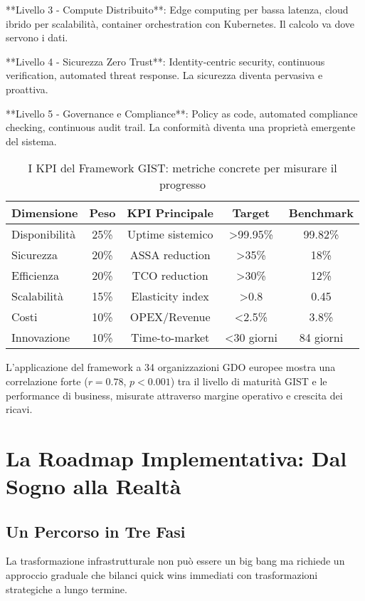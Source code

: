 \documentclass[12pt,a4paper,twoside]{book}
\begin{document}
**Livello 3 - Compute Distribuito**: Edge computing per bassa latenza, cloud ibrido per scalabilità, container orchestration con Kubernetes. Il calcolo va dove servono i dati.

**Livello 4 - Sicurezza Zero Trust**: Identity-centric security, continuous verification, automated threat response. La sicurezza diventa pervasiva e proattiva.

**Livello 5 - Governance e Compliance**: Policy as code, automated compliance checking, continuous audit trail. La conformità diventa una proprietà emergente del sistema.

\begin{table}[htbp]
\centering
\caption{I KPI del Framework GIST: metriche concrete per misurare il progresso}
\label{tab:gist_kpi}
\begin{tabular}{lcccc}
\toprule
\textbf{Dimensione} & \textbf{Peso} & \textbf{KPI Principale} & \textbf{Target} & \textbf{Benchmark} \\
\midrule
Disponibilità & 25\% & Uptime sistemico & >99.95\% & 99.82\% \\
Sicurezza & 20\% & ASSA reduction & >35\% & 18\% \\
Efficienza & 20\% & TCO reduction & >30\% & 12\% \\
Scalabilità & 15\% & Elasticity index & >0.8 & 0.45 \\
Costi & 10\% & OPEX/Revenue & <2.5\% & 3.8\% \\
Innovazione & 10\% & Time-to-market & <30 giorni & 84 giorni \\
\bottomrule
\end{tabular}
\end{table}

L'applicazione del framework a 34 organizzazioni GDO europee mostra una correlazione forte ($r = 0.78$, $p < 0.001$) tra il livello di maturità GIST e le performance di business, misurate attraverso margine operativo e crescita dei ricavi.

\section{La Roadmap Implementativa: Dal Sogno alla Realtà}

\subsection{Un Percorso in Tre Fasi}

La trasformazione infrastrutturale non può essere un big bang ma richiede un approccio graduale che bilanci quick wins immediati con trasformazioni strategiche a lungo termine.
\end{document}
